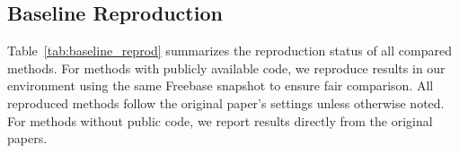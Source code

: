 \documentclass[11pt]{article}
\begin{document}
\subsection{Baseline Reproduction}

Table~\ref{tab:baseline_reprod} summarizes the reproduction status of all compared methods. For methods with publicly available code, we reproduce results in our environment using the same Freebase snapshot to ensure fair comparison. All reproduced methods follow the original paper's settings unless otherwise noted. For methods without public code, we report results directly from the original papers.

\begin{table}[h]
\centering
\small
\setlength{\tabcolsep}{3pt}
\caption{Baseline reproduction status. : reproduced in our environment; : results from the original paper. \textsuperscript{$\dagger$}The original ChatKBQA uses Llama-2-13B on CWQ and Llama-2-7B on WebQSP; we unify both to Llama-2-7B for fair comparison under the same model scale.}
\label{tab:baseline_reprod}
\end{table}
\end{document}
